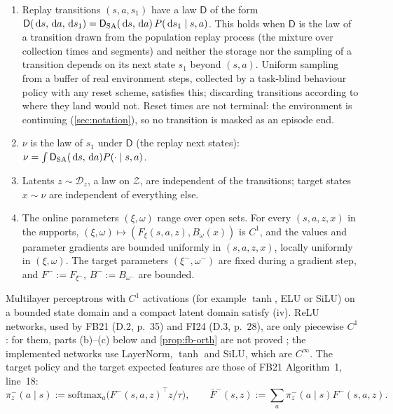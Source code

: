 \begin{assumption}\label{ass:fb-data}
\leavevmode
\begin{enumerate}[nosep,label=(\roman*)]
\item Replay transitions $(s,a,s_1)$ have a law $\mathsf D$ of the form $\mathsf D(\,\mathrm{d} s,\,\mathrm{d} a,\,\mathrm{d} s_1)=\mathsf D_{\mathrm{SA}}(\,\mathrm{d} s,\,\mathrm{d} a)\,P(\,\mathrm{d} s_1\mid s,a)$.
  This holds when $\mathsf D$ is the law of a transition drawn from the population replay process (the mixture over collection times and segments) and neither the storage nor the sampling of a transition depends on its next state $s_1$ beyond $(s,a)$.
  Uniform sampling from a buffer of real environment steps, collected by a task-blind behaviour policy with any reset scheme, satisfies this; discarding transitions according to where they land would not.
  Reset times are not terminal: the environment is continuing (\cref{sec:notation}), so no transition is masked as an episode end.
\item $\nu$ is the law of $s_1$ under $\mathsf D$ (the replay next states): $\nu=\int\mathsf D_{\mathrm{SA}}(\,\mathrm{d} s,\,\mathrm{d} a)P(\cdot\mid s,a)$.
\item Latents $z\sim\mathcal D_z$, a law on $\mathcal Z$, are independent of the transitions; target states $x\sim\nu$ are independent of everything else.
\item The online parameters $(\xi,\omega)$ range over open sets. For every $(s,a,z,x)$ in the supports, $(\xi,\omega)\mapsto(F_\xi(s,a,z),B_\omega(x))$ is $C^1$, and the values and parameter gradients are bounded uniformly in $(s,a,z,x)$, locally uniformly in $(\xi,\omega)$.
  The target parameters $(\xi^-,\omega^-)$ are fixed during a gradient step, and $F^-:=F_{\xi^-}$, $B^-:=B_{\omega^-}$ are bounded.
\end{enumerate}
\end{assumption}
Multilayer perceptrons with $C^1$ activations (for example $\tanh$, ELU or SiLU) on a bounded state domain and a compact latent domain satisfy (iv).
ReLU networks, used by FB21 (D.2, p.~35) and FI24 (D.3, p.~28), are only piecewise $C^1$: for them, parts (b)--(c) below and \cref{prop:fb-orth} are not proved ; the implemented networks use LayerNorm, $\tanh$ and SiLU, which are $C^\infty$.
The target policy and the target expected features are those of FB21 Algorithm~1, line~18:
\begin{equation}\label{eq:fb-target}
\pi^-_z(a\mid s):=\mathrm{softmax}_a\big(F^-(s,a,z)^\top z/\tau\big),\qquad\bar F^-(s,z):=\sum_a\pi^-_z(a\mid s)F^-(s,a,z).
\end{equation}
